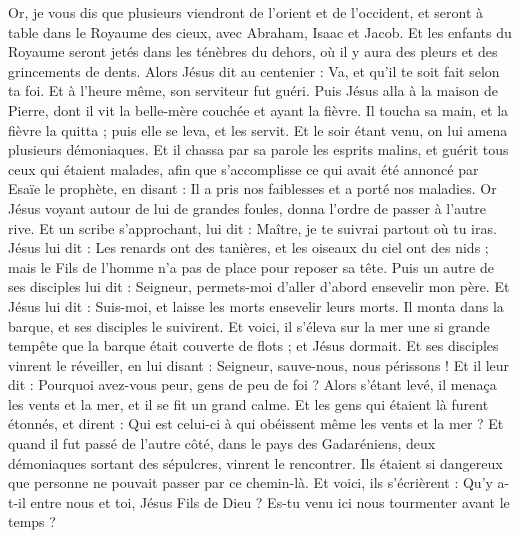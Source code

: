 \begin{multicols}{2}
Or, je vous dis que plusieurs viendront de l’orient et de l’occident, et seront à table dans le Royaume des cieux, avec Abraham, Isaac et Jacob.
Et les enfants du Royaume seront jetés dans les ténèbres du dehors, où il y aura des pleurs et des grincements de dents.
Alors Jésus dit au centenier : Va, et qu'il te soit fait selon ta foi. Et à l'heure même, son serviteur fut guéri.
Puis Jésus alla à la maison de Pierre, dont il vit la belle-mère couchée et ayant la fièvre.
Il toucha sa main, et la fièvre la quitta ; puis elle se leva, et les servit.
Et le soir étant venu, on lui amena plusieurs démoniaques. Et il chassa par sa parole les esprits malins, et guérit tous ceux qui étaient malades,
afin que s’accomplisse ce qui avait été annoncé par Esaïe le prophète, en disant : Il a pris nos faiblesses et a porté nos maladies.
Or Jésus voyant autour de lui de grandes foules, donna l’ordre de passer à l'autre rive.
Et un scribe s'approchant, lui dit : Maître, je te suivrai partout où tu iras.
Jésus lui dit : Les renards ont des tanières, et les oiseaux du ciel ont des nids ; mais le Fils de l'homme n'a pas de place pour reposer sa tête.
Puis un autre de ses disciples lui dit : Seigneur, permets-moi d'aller d’abord ensevelir mon père.
Et Jésus lui dit : Suis-moi, et laisse les morts ensevelir leurs morts.
Il monta dans la barque, et ses disciples le suivirent.
Et voici, il s'éleva sur la mer une si grande tempête que la barque était couverte de flots ; et Jésus dormait.
Et ses disciples vinrent le réveiller, en lui disant : Seigneur, sauve-nous, nous périssons !
Et il leur dit : Pourquoi avez-vous peur, gens de peu de foi ? Alors s'étant levé, il menaça les vents et la mer, et il se fit un grand calme.
Et les gens qui étaient là furent étonnés, et dirent : Qui est celui-ci à qui obéissent même les vents et la mer ?
Et quand il fut passé de l'autre côté, dans le pays des Gadaréniens, deux démoniaques sortant des sépulcres, vinrent le rencontrer. Ils étaient si dangereux que personne ne pouvait passer par ce chemin-là.
Et voici, ils s'écrièrent : Qu'y a-t-il entre nous et toi, Jésus Fils de Dieu ? Es-tu venu ici nous tourmenter avant le temps ?

\end{multicols}
